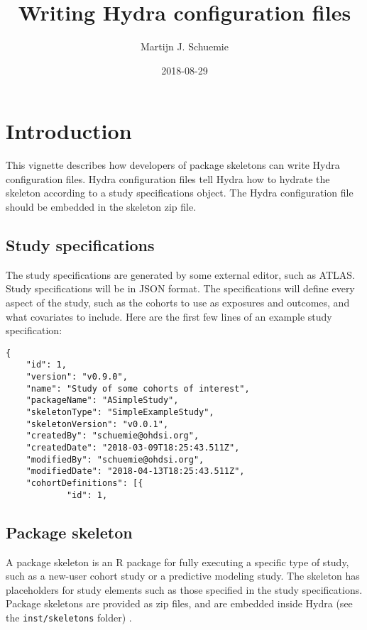 \documentclass[]{article}
\title{Writing Hydra configuration files}
\author{Martijn J. Schuemie}
\date{2018-08-29}
\begin{document}
\maketitle

{
\setcounter{tocdepth}{2}
\tableofcontents
}
\hypertarget{introduction}{%
\section{Introduction}\label{introduction}}

This vignette describes how developers of package skeletons can write
Hydra configuration files. Hydra configuration files tell Hydra how to
hydrate the skeleton according to a study specifications object. The
Hydra configuration file should be embedded in the skeleton zip file.

\hypertarget{study-specifications}{%
\subsection{Study specifications}\label{study-specifications}}

The study specifications are generated by some external editor, such as
ATLAS. Study specifications will be in JSON format. The specifications
will define every aspect of the study, such as the cohorts to use as
exposures and outcomes, and what covariates to include. Here are the
first few lines of an example study specification:

\begin{verbatim}
{
    "id": 1,
    "version": "v0.9.0",
    "name": "Study of some cohorts of interest",
    "packageName": "ASimpleStudy",
    "skeletonType": "SimpleExampleStudy",
    "skeletonVersion": "v0.0.1",
    "createdBy": "schuemie@ohdsi.org",
    "createdDate": "2018-03-09T18:25:43.511Z",
    "modifiedBy": "schuemie@ohdsi.org",
    "modifiedDate": "2018-04-13T18:25:43.511Z",
    "cohortDefinitions": [{
            "id": 1,
\end{verbatim}

\hypertarget{package-skeleton}{%
\subsection{Package skeleton}\label{package-skeleton}}

A package skeleton is an R package for fully executing a specific type
of study, such as a new-user cohort study or a predictive modeling
study. The skeleton has placeholders for study elements such as those
specified in the study specifications. Package skeletons are provided as
zip files, and are embedded inside Hydra (see the
\texttt{inst/skeletons} folder) .
\end{document}

